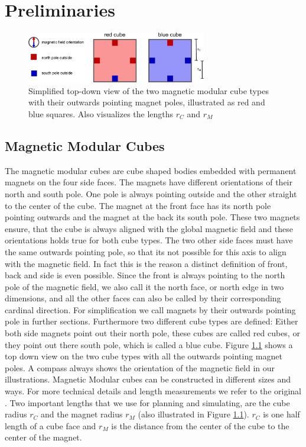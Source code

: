 \chapter{Preliminaries}

\begin{figure}
	\centering
	\includegraphics[width=0.70\textwidth]{figures/magnetic_cubes.pdf}
	\caption{Simplified top-down view of the two magnetic modular cube types with their outwards pointing magnet poles, illustrated as red and blue squares. Also visualizes the lengths $r_C$ and $r_M$}
	\label{fig:magnetic_cubes}
\end{figure}

\section{Magnetic Modular Cubes}
The magnetic modular cubes are cube shaped bodies embedded with permanent magnets on the four side faces.
The magnets have different orientations of their north and south pole. 
One pole is always pointing outside and the other straight to the center of the cube.
The magnet at the front face has its north pole pointing outwards and the magnet at the back its south pole.
These two magnets ensure, that the cube is always aligned with the global magnetic field and these orientations holds true for both cube types.
The two other side faces must have the same outwards pointing pole, so that its not possible for this axis to align with the magnetic field.
In fact this is the reason a distinct definition of front, back and side is even possible.
Since the front is always pointing to the north pole of the magnetic field, we also call it the north face, or north edge in two dimensions, and all the other faces can also be called by their corresponding cardinal direction.
For simplification we call magnets by their outwards pointing pole in further sections.
Furthermore two different cube types are defined:
Either both side magnets point out their north pole, these cubes are called red cubes, or they point out there south pole, which is called a blue cube.
Figure \ref{fig:magnetic_cubes} shows a top down view on the two cube types with all the outwards pointing magnet poles.
A compass always shows the orientation of the magnetic field in our illustrations.
Magnetic Modular cubes can be constructed in different sizes and ways. For more technical details and length measurements we refer to the original \cite{Bhattacharjee2022}.
Two important lengths that we use for planning and simulating, are the cube radius $r_C$ and the magnet radius $r_M$ (also illustrated in Figure \ref{fig:magnetic_cubes}).
$r_C$ is one half length of a cube face and $r_M$ is the distance from the center of the cube to the center of the magnet.

